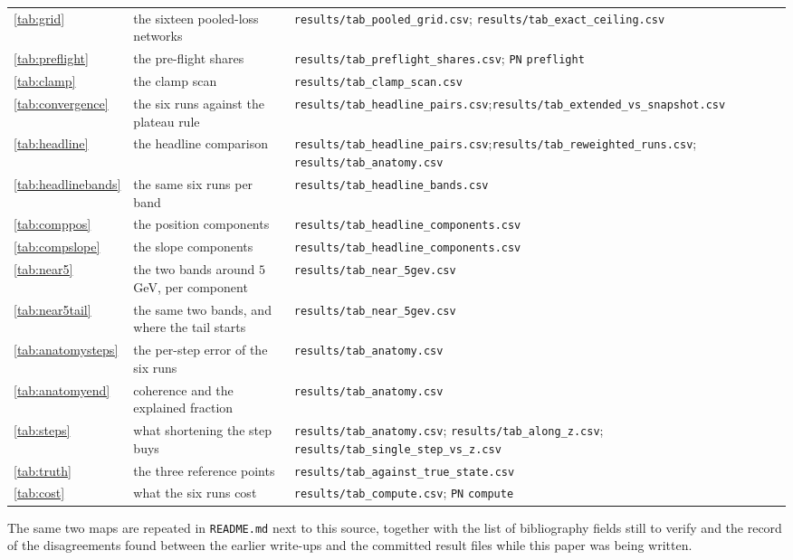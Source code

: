 \documentclass[11pt,a4paper]{article}
\begin{document}
\begin{table}[htbp]
\begin{tabular}{@{}l p{4.0cm} p{8.8cm}@{}}
    \ref{tab:grid} & the sixteen pooled-loss networks
      & \texttt{results/tab\_pooled\_grid.csv}; \texttt{results/tab\_exact\_ceiling.csv} \\
    \ref{tab:preflight} & the pre-flight shares
      & \texttt{results/tab\_preflight\_shares.csv}; \texttt{PN} \texttt{preflight} \\
    \ref{tab:clamp} & the clamp scan & \texttt{results/tab\_clamp\_scan.csv} \\
    \ref{tab:convergence} & the six runs against the plateau rule
      & \texttt{results/tab\_headline\_pairs.csv};\newline \texttt{results/tab\_extended\_vs\_snapshot.csv} \\
    \ref{tab:headline} & the headline comparison
      & \texttt{results/tab\_headline\_pairs.csv};\newline \texttt{results/tab\_reweighted\_runs.csv}; \texttt{results/tab\_anatomy.csv} \\
    \ref{tab:headlinebands} & the same six runs per band & \texttt{results/tab\_headline\_bands.csv} \\
    \ref{tab:comppos} & the position components & \texttt{results/tab\_headline\_components.csv} \\
    \ref{tab:compslope} & the slope components & \texttt{results/tab\_headline\_components.csv} \\
    \ref{tab:near5} & the two bands around $5$ GeV, per component & \texttt{results/tab\_near\_5gev.csv} \\
    \ref{tab:near5tail} & the same two bands, and where the tail starts & \texttt{results/tab\_near\_5gev.csv} \\
    \ref{tab:anatomysteps} & the per-step error of the six runs & \texttt{results/tab\_anatomy.csv} \\
    \ref{tab:anatomyend} & coherence and the explained fraction & \texttt{results/tab\_anatomy.csv} \\
    \ref{tab:steps} & what shortening the step buys
      & \texttt{results/tab\_anatomy.csv}; \texttt{results/tab\_along\_z.csv}; \texttt{results/tab\_single\_step\_vs\_z.csv} \\
    \ref{tab:truth} & the three reference points & \texttt{results/tab\_against\_true\_state.csv} \\
    \ref{tab:cost} & what the six runs cost
      & \texttt{results/tab\_compute.csv}; \texttt{PN} \texttt{compute} \\
    \bottomrule
  \end{tabular}
\end{table}

The same two maps are repeated in \texttt{README.md} next to this source,
together with the list of bibliography fields still to verify and the record of
the disagreements found between the earlier write-ups and the committed result
files while this paper was being written.

\clearpage



\end{document}
